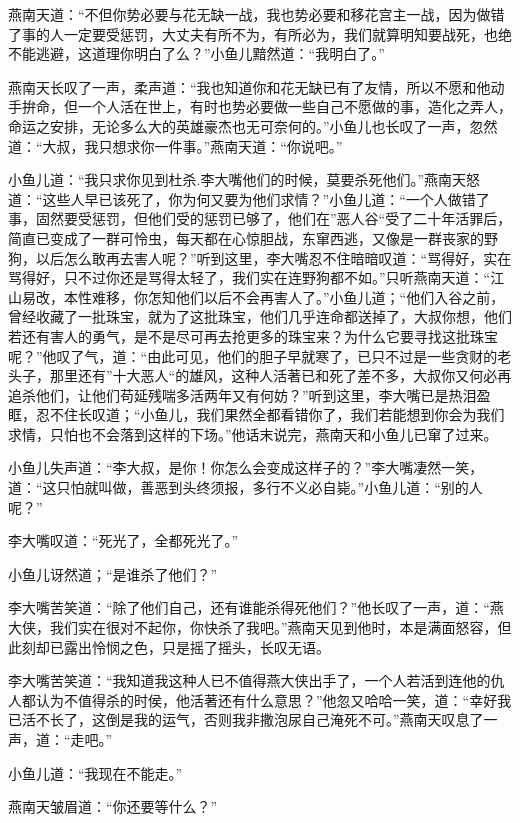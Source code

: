 \documentclass[12pt,oneside]{book}
\begin{document}
燕南天道：``不但你势必要与花无缺一战，我也势必要和移花宫主一战，因为做错了事的人一定要受惩罚，大丈夫有所不为，有所必为，我们就算明知要战死，也绝不能逃避，这道理你明白了么？''小鱼儿黯然道：``我明白了。''

燕南天长叹了一声，柔声道：``我也知道你和花无缺已有了友情，所以不愿和他动手拚命，但一个人活在世上，有时也势必要做一些自己不愿做的事，造化之弄人，命运之安排，无论多么大的英雄豪杰也无可奈何的。''小鱼儿也长叹了一声，忽然道：``大叔，我只想求你一件事。''燕南天道：``你说吧。''

小鱼儿道：``我只求你见到杜杀.李大嘴他们的时候，莫要杀死他们。''燕南天怒道：``这些人早已该死了，你为何又要为他们求情？''小鱼儿道：``一个人做错了事，固然要受惩罚，但他们受的惩罚已够了，他们在''恶人谷``受了二十年活罪后，简直已变成了一群可怜虫，每天都在心惊胆战，东窜西逃，又像是一群丧家的野狗，以后怎么敢再去害人呢？''听到这里，李大嘴忍不住暗暗叹道：``骂得好，实在骂得好，只不过你还是骂得太轻了，我们实在连野狗都不如。''只听燕南天道：``江山易改，本性难移，你怎知他们以后不会再害人了。''小鱼儿道；``他们入谷之前，曾经收藏了一批珠宝，就为了这批珠宝，他们几乎连命都送掉了，大叔你想，他们若还有害人的勇气，是不是尽可再去抢更多的珠宝来？为什么它要寻找这批珠宝呢？''他叹了气，道：``由此可见，他们的胆子早就寒了，已只不过是一些贪财的老头子，那里还有''十大恶人``的雄风，这种人活著已和死了差不多，大叔你又何必再追杀他们，让他们苟延残喘多活两年又有何妨？''听到这里，李大嘴已是热泪盈眶，忍不住长叹道；``小鱼儿，我们果然全都看错你了，我们若能想到你会为我们求情，只怕也不会落到这样的下场。''他话末说完，燕南天和小鱼儿已窜了过来。

小鱼儿失声道：``李大叔，是你！你怎么会变成这样子的？''李大嘴凄然一笑，道：``这只怕就叫做，善恶到头终须报，多行不义必自毙。''小鱼儿道：``别的人呢？''

李大嘴叹道：``死光了，全都死光了。''

小鱼儿讶然道；``是谁杀了他们？''

李大嘴苦笑道：``除了他们自己，还有谁能杀得死他们？''他长叹了一声，道：``燕大侠，我们实在很对不起你，你快杀了我吧。''燕南天见到他时，本是满面怒容，但此刻却已露出怜悯之色，只是摇了摇头，长叹无语。

李大嘴苦笑道：``我知道我这种人已不值得燕大侠出手了，一个人若活到连他的仇人都认为不值得杀的时侯，他活著还有什么意思？''他忽又哈哈一笑，道：``幸好我已活不长了，这倒是我的运气，否则我非撒泡尿自己淹死不可。''燕南天叹息了一声，道：``走吧。''

小鱼儿道：``我现在不能走。''

燕南天皱眉道：``你还要等什么？''
\end{document}
